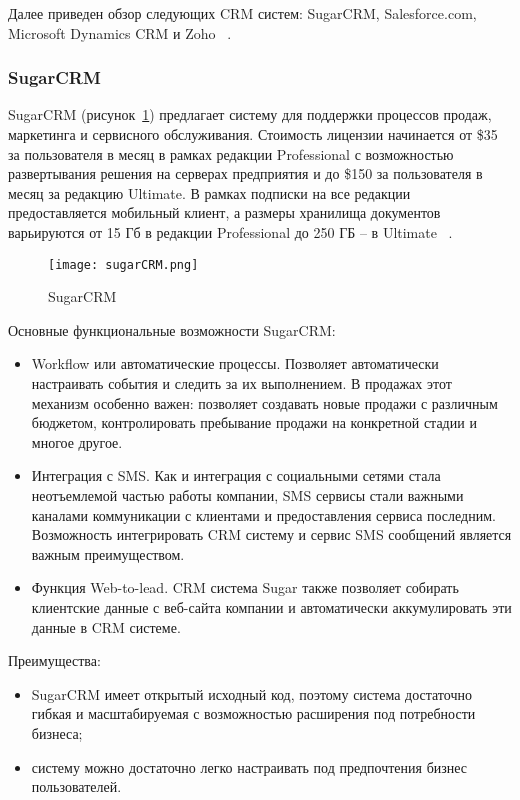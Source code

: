 Далее приведен обзор следующих CRM систем: SugarCRM, Salesforce.com, Microsoft Dynamics CRM и Zoho ~\cite{crms}.


\subsubsection{SugarCRM }
\label{sub:alternatives:crm:sugar}
SugarCRM (рисунок~\ref{fig:sugar}) предлагает систему для поддержки процессов продаж, маркетинга и сервисного обслуживания. Стоимость лицензии начинается от \$35 за пользователя в месяц в рамках редакции Professional с возможностью развертывания решения на серверах предприятия и до \$150 за пользователя в месяц за редакцию Ultimate. В рамках подписки на все редакции предоставляется мобильный клиент, а размеры хранилища документов варьируются от 15 Гб в редакции Professional до 250 ГБ – в Ultimate ~\cite{sugar}.

\begin{figure}[h]
\centering
  \texttt{[image: sugarCRM.png]}  
  \caption{SugarCRM}
  \label{fig:sugar}
\end{figure}

Основные функциональные возможности SugarCRM:
\begin{itemize}
\item Workflow или автоматические процессы. Позволяет автоматически настраивать события и следить за их выполнением. В продажах этот механизм особенно важен: позволяет создавать новые продажи с различным бюджетом, контролировать пребывание продажи на конкретной стадии и многое другое.
\item Интеграция с SMS. Как и интеграция с социальными сетями стала неотъемлемой частью работы компании, SMS сервисы стали важными каналами коммуникации с клиентами и предоставления сервиса последним. Возможность интегрировать CRM систему и сервис SMS сообщений является важным преимуществом.
\item Функция Web-to-lead. CRM система Sugar также позволяет собирать клиентские данные с веб-сайта компании и автоматически аккумулировать эти данные в CRM системе.
\end{itemize}

Преимущества: 
\begin{itemize}
\item SugarCRM имеет открытый исходный код, поэтому система достаточно гибкая и масштабируемая с возможностью расширения под потребности бизнеса;
\item систему можно достаточно легко настраивать под предпочтения бизнес пользователей.
\end{itemize}

